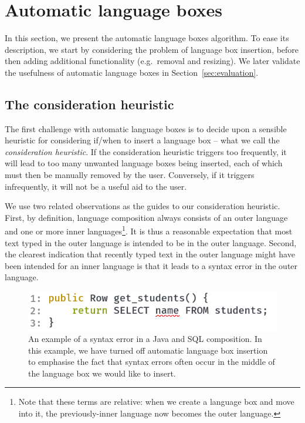 \documentclass[sigplan,screen]{acmart}\settopmatter{printfolios=true,printccs=false,printacmref=false}
\begin{document}
\section{Automatic language boxes}

In this section, we present the automatic language boxes algorithm. To ease its
description, we start by considering the problem of language box
insertion, before then adding additional functionality (e.g.~removal and
resizing). We later validate the usefulness of automatic language boxes in
Section~\ref{sec:evaluation}.


\subsection{The consideration heuristic}

The first challenge with automatic language boxes is to decide upon a sensible
heuristic for considering if/when to insert a language box -- what we call the
\emph{consideration heuristic}. If the consideration heuristic triggers too
frequently, it will lead to too many unwanted language boxes being inserted,
each of which must then be manually removed by the user.
Conversely, if it triggers infrequently, it will not be a useful aid to the user.

We use two related observations as the guides to our consideration heuristic.
First, by definition, language composition always consists of an outer language
and one or more inner languages\footnote{Note that these terms are relative:
when we create a language box and move into it, the previously-inner language
now becomes the outer language.}. It is thus a reasonable expectation that most
text typed in the outer language is intended to be in the outer language.
Second, the clearest indication that recently typed text in the outer language
might have been intended for an inner language is that it leads to a syntax error
in the outer language.

\begin{figure}[tb]
    \includegraphics[width=.45\textwidth]{images/composition_error1.png}
    \caption{An example of a syntax error in a Java and SQL composition. In
      this example, we have turned off automatic language box insertion to
      emphasise the fact that syntax errors often occur in the middle of the
      language box we would like to insert.}
\label{fig:consideration}
\end{figure}
\end{document}
